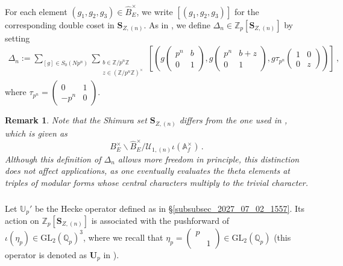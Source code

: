 \documentclass{amsart}
\numberwithin{equation}{section}
\newtheorem{remark}[theorem]{Remark}
\newcommand{\Qp}{{\mathbb{Q}_p}}
\newcommand{\Zp}{\mathbb{Z}_p}
\newcommand{\ZZ}{\mathbb{Z}}
\renewcommand{\AA}{\mathbb{A}}
\newcommand{\GL}{\mathrm{GL}}
\begin{document}
\subsubsection{} For each element $(g_1,g_2,g_3) \in \widehat{B}_E^\times$, we write $[(g_1,g_2,g_3)]$ for the corresponding double coset in $\mathbf{S}_{Z,(n)}$. As in \cite[Definition 4.6]{hsiehpadicbalanced}, we define $\Delta_n  \in \Zp[\mathbf{S}_{Z,(n)}]$ by setting
\begin{align}\label{eqn_Hsieh_element}
    \Delta_n  := \sum_{[g] \in S_0(N p^n)} \sum_{\substack{b \in \ZZ/p^n \ZZ \\ z\in  (\ZZ/p^n \ZZ)^\times}} \left[\left( g \left( \begin{smallmatrix} p^n & b \\ 0 & 1 \end{smallmatrix} \right),  g \left( \begin{smallmatrix}
    p^n & b + z \\ 0 & 1 
\end{smallmatrix} \right), g \tau_{p^n} \left( \begin{smallmatrix}
 1 & 0 \\ 0 & z   
\end{smallmatrix} \right) \right) \right ]\,, 
\end{align} 
where $\tau_{p^n} = \left( \begin{smallmatrix}
 0 & 1 \\ - p^n & 0   
\end{smallmatrix} \right)$. 

\begin{remark}
Note that the Shimura set $ \mathbf{S}_{Z,(n)}$ differs from the one used in \cite[\S 4.6]{hsiehpadicbalanced}, which is given as
$$B_E^\times \backslash \widehat{B}_E^\times / \mathcal{U}_{1,(n)} \iota (\AA_f^\times)\,.$$
Although this definition of $\Delta_n$ allows more freedom in principle, this distinction does not affect applications, as one eventually evaluates the theta elements at triples of modular forms whose central characters multiply to the trivial character.
\end{remark}



\subsubsection{}\label{subsec_2025_10_14_1517} Let $\mathbb{U}_p'$ be the Hecke operator defined as in \S \ref{subsubsec_2027_07_02_1557}. Its action on $\Zp[\mathbf{S}_{Z,(n)}]$ is associated with the pushforward of $\iota(\eta_p) \in \mathrm{GL}_2(\Qp)^3$, where we recall that $\eta_p =\left( \begin{smallmatrix} p &  \\  & 1 \end{smallmatrix} \right) \in \GL_2(\Qp)$ (this operator is denoted as $\mathbf{U}_p$ in \cite[\S 4.4]{hsiehpadicbalanced}).
\end{document}
